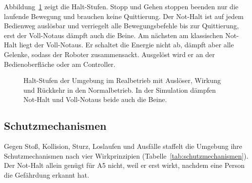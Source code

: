 Abbildung~\ref{fig:betriebszustaende} zeigt die Halt-Stufen.
Stopp und Gehen stoppen beenden nur die laufende Bewegung und brauchen keine Quittierung.
Der Not-Halt ist auf jedem Bedienweg auslösbar und verriegelt alle Bewegungsbefehle bis zur Quittierung, erst der Voll-Notaus dämpft auch die Beine.
Am nächsten am klassischen Not-Halt \cite{Ding2026} liegt der Voll-Notaus.
Er schaltet die Energie nicht ab, dämpft aber alle Gelenke, sodass der Roboter zusammensackt.
Ausgelöst wird er an der Bedienoberfläche oder am Controller.

\begin{figure}[htbp]
  \centering
  
  \caption[Halt-Stufen der Umgebung]{Halt-Stufen der Umgebung im Realbetrieb mit Auslöser, Wirkung und Rückkehr in den Normalbetrieb. In der Simulation dämpfen Not-Halt und Voll-Notaus beide auch die Beine.}
  \label{fig:betriebszustaende}
\end{figure}

\subsection{Schutzmechanismen}
\label{sec:schutzmechanismen}

Gegen Stoß, Kollision, Sturz, Loslaufen und Ausfälle staffelt die Umgebung ihre Schutzmechanismen nach vier Wirkprinzipien (Tabelle~\ref{tab:schutzmechanismen}).
Der Not-Halt allein genügt für A5 nicht, weil er erst wirkt, nachdem eine Person die Gefährdung erkannt hat.

